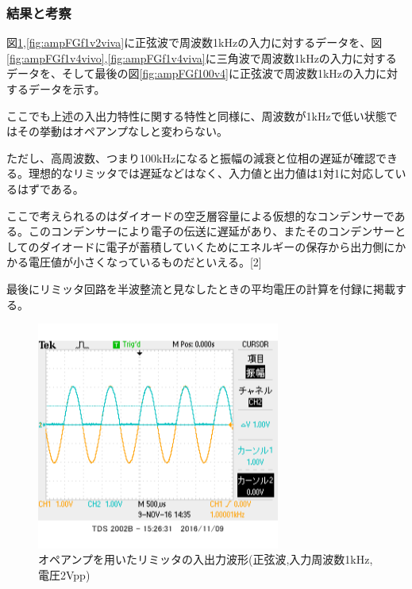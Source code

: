\documentclass[11pt,a4j]{jsarticle}
\begin{document}
   \subsubsection{結果と考察} \label{sec:amp_wave}
    図\ref{fig:ampFGf1v2vivo},\ref{fig:ampFGf1v2viva}に正弦波で周波数1kHzの入力に対するデータを、図\ref{fig:ampFGf1v4vivo},\ref{fig:ampFGf1v4viva}に三角波で周波数1kHzの入力に対するデータを、そして最後の図\ref{fig:ampFGf100v4}に正弦波で周波数1kHzの入力に対するデータを示す。
    
    ここでも上述の入出力特性に関する特性と同様に、周波数が1kHzで低い状態ではその挙動はオペアンプなしと変わらない。
    
    ただし、高周波数、つまり100kHzになると振幅の減衰と位相の遅延が確認できる。理想的なリミッタでは遅延などはなく、入力値と出力値は1対1に対応しているはずである。
    
    ここで考えられるのはダイオードの空乏層容量による仮想的なコンデンサーである。このコンデンサーにより電子の伝送に遅延があり、またそのコンデンサーとしてのダイオードに電子が蓄積していくためにエネルギーの保存から出力側にかかる電圧値が小さくなっているものだといえる。[2]
    
    最後にリミッタ回路を半波整流と見なしたときの平均電圧の計算を付録に掲載する。
    
    \begin{figure}[htbp]
  \centering
  \includegraphics[width=8cm,clip]{1_1_ampFG_f1V2_ViVo.png}
  \caption{オペアンプを用いたリミッタの入出力波形(正弦波,入力周波数1kHz,電圧2Vpp)}
  \label{fig:ampFGf1v2vivo}
 \end{figure}%
 
\end{document}
